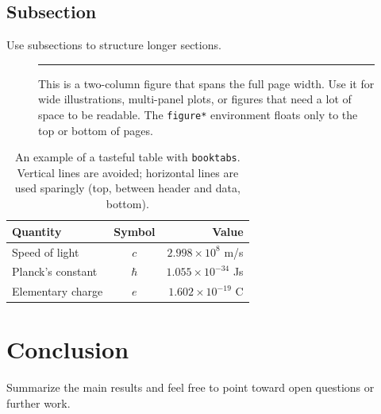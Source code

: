 \documentclass[a4paper,10pt,twocolumn]{article}
\begin{document}
\subsection{Subsection}

Use subsections to structure longer sections.

\begin{figure}[t]
  \centering
  \rule{0.9\linewidth}{3.5cm}   %
  \caption{This is a two-column figure that spans the full page
           width. Use it for wide illustrations, multi-panel plots, or figures that need a lot of space to be readable. The \texttt{figure*} environment floats only to the top or bottom of pages.}
  \label{fig:wide}
\end{figure}

\begin{table}[t]
  \centering
  \caption{An example of a tasteful table with \texttt{booktabs}.
           Vertical lines are avoided; horizontal lines are used sparingly (top, between header and data, bottom).}
  \label{tab:example}
  \begin{tabular}{lcr}
    \toprule
    Quantity & Symbol & Value \\
    \midrule
    Speed of light       & $c$      & $2.998 \times 10^8$ m/s \\
    Planck's constant    & $\hbar$  & $1.055 \times 10^{-34}$ Js \\
    Elementary charge    & $e$      & $1.602 \times 10^{-19}$ C \\
    \bottomrule
  \end{tabular}
\end{table}

\section{Conclusion}

Summarize the main results and feel free to point toward open questions or further work.



\end{document}
